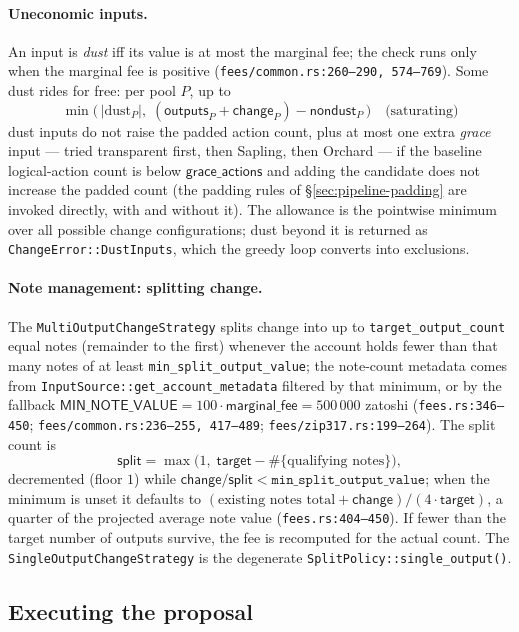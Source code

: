 \documentclass[11pt,a4paper]{article}
\theoremstyle{definition}
\begin{document}
\paragraph{Uneconomic inputs.} An input is \emph{dust} iff its value is at
most the marginal fee; the check runs only when the marginal fee is
positive (\texttt{fees/common.rs:260--290, 574--769}). Some dust rides for
free: per pool $P$, up to
\[
\min\bigl(\,|\mathrm{dust}_P|,\;
(\mathsf{outputs}_P + \mathsf{change}_P) - \mathsf{nondust}_P\,\bigr)
\quad \text{(saturating)}
\]
dust inputs do not raise the padded action count, plus at most one extra
\emph{grace} input --- tried transparent first, then Sapling, then
Orchard --- if the baseline logical-action count is below
$\mathsf{grace\_actions}$ and adding the candidate does not increase the
padded count (the padding rules of \S\ref{sec:pipeline-padding} are invoked
directly, with and without it). The allowance is the pointwise minimum over
all possible change configurations; dust beyond it is returned as
\texttt{ChangeError::DustInputs}, which the greedy loop converts into
exclusions.

\paragraph{Note management: splitting change.} The
\texttt{MultiOutputChangeStrategy} splits change into up to
\texttt{target\_output\_count} equal notes (remainder to the first) whenever
the account holds fewer than that many notes of at least
\texttt{min\_split\_output\_value}; the note-count metadata comes from
\texttt{InputSource::get\_account\_metadata} filtered by that minimum, or by
the fallback $\mathsf{MIN\_NOTE\_VALUE} = 100 \cdot \mathsf{marginal\_fee} =
500\,000$ zatoshi (\texttt{fees.rs:346--450}; \texttt{fees/common.rs:236--255,
417--489}; \texttt{fees/zip317.rs:199--264}). The split count is
\[
\mathsf{split} = \max\bigl(1,\; \mathsf{target} -
\#\{\text{qualifying notes}\}\bigr),
\]
decremented (floor $1$) while
$\mathsf{change}/\mathsf{split} < \texttt{min\_split\_output\_value}$; when
the minimum is unset it defaults to
$(\text{existing notes total} + \mathsf{change}) / (4 \cdot
\mathsf{target})$, a quarter of the projected average note value
(\texttt{fees.rs:404--450}). If fewer than the target number of outputs
survive, the fee is recomputed for the actual count. The
\texttt{SingleOutputChangeStrategy} is the degenerate
\texttt{SplitPolicy::single\_output()}.
\subsection{Executing the proposal}\label{sec:pipeline-execute}
\end{document}
